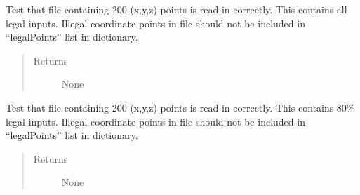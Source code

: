 \documentclass[letterpaper,10pt,english]{sphinxmanual}
\begin{document}
\begin{fulllineitems}

\begin{fulllineitems}
\label{\detokenize{index:src.Tests.Graph_Test.Graph_Test.test_readCoordinates_size200_allLegal}}
Test that file containing 200 (x,y,z) points is read in correctly. This contains all legal inputs.
Illegal coordinate points in file should not be included in “legalPoints” list in dictionary.
\begin{quote}\begin{description}
\item[{Returns}] \leavevmode
None

\end{description}\end{quote}

\end{fulllineitems}


\begin{fulllineitems}
\label{\detokenize{index:src.Tests.Graph_Test.Graph_Test.test_readCoordinates_size200_someLegal}}
Test that file containing 200 (x,y,z) points is read in correctly. This contains 80\% legal inputs.
Illegal coordinate points in file should not be included in “legalPoints” list in dictionary.
\begin{quote}\begin{description}
\item[{Returns}] \leavevmode
None

\end{description}\end{quote}

\end{fulllineitems}



\end{fulllineitems}
\end{document}
